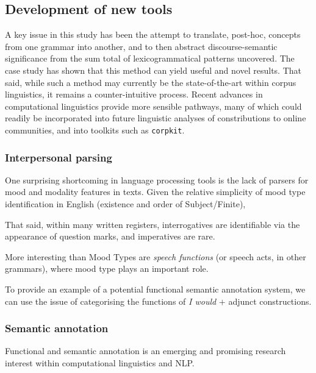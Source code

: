 \subsection{Development of new tools}

A key issue in this study has been the attempt to translate, post\hyp{}hoc, concepts from one grammar into another, and to then abstract discourse\hyp{}semantic significance from the sum total of lexicogrammatical patterns uncovered. The case study has shown that this method can yield useful and novel results. That said, while such a method may currently be the state\hyp{}of\hyp{}the\hyp{}art within corpus linguistics, it remains a counter\hyp{}intuitive process. Recent advances in computational linguistics provide more sensible pathways, many of which could readily be incorporated into future linguistic analyses of constributions to online communities, and into toolkits such as \texttt{corpkit}.

\subsubsection{Interpersonal parsing}

One surprising shortcoming in language processing tools is the lack of parsers for mood and modality features in texts. Given the relative simplicity of mood type identification in English (existence and order of Subject\slash Finite), 

That said, within many written registers, interrogatives are identifiable via the appearance of question marks, and imperatives are rare.

More interesting than Mood Types are \emph{speech functions} (or speech acts, in other grammars), where mood type plays an important role. 

To provide an example of a potential functional semantic annotation system, we can use the issue of categorising the functions of \emph{I would} $+$ adjunct constructions.


\subsubsection{Semantic annotation}


Functional and semantic annotation is an emerging and promising research interest within computational linguistics and NLP.


